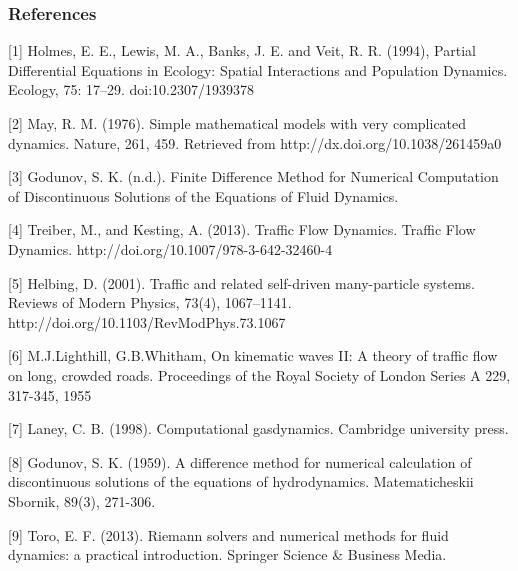 \documentclass[11pt]{article}
\begin{document}
\subsubsection{References}\label{references}

 {[}1{]} Holmes, E. E., Lewis, M. A., Banks, J. E. and Veit, R. R.
(1994), Partial Differential Equations in Ecology: Spatial Interactions
and Population Dynamics. Ecology, 75: 17--29. doi:10.2307/1939378

{[}2{]} May, R. M. (1976). Simple mathematical models with very
complicated dynamics. Nature, 261, 459. Retrieved from
http://dx.doi.org/10.1038/261459a0

{[}3{]} Godunov, S. K. (n.d.). Finite Difference Method for Numerical
Computation of Discontinuous Solutions of the Equations of Fluid
Dynamics.

{[}4{]} Treiber, M., and Kesting, A. (2013). Traffic Flow Dynamics.
Traffic Flow Dynamics. http://doi.org/10.1007/978-3-642-32460-4

{[}5{]} Helbing, D. (2001). Traffic and related self-driven
many-particle systems. Reviews of Modern Physics, 73(4), 1067--1141.
http://doi.org/10.1103/RevModPhys.73.1067

{[}6{]} M.J.Lighthill, G.B.Whitham, On kinematic waves II: A theory of
traffic flow on long, crowded roads. Proceedings of the Royal Society of
London Series A 229, 317-345, 1955

{[}7{]} Laney, C. B. (1998). Computational gasdynamics. Cambridge
university press.

{[}8{]} Godunov, S. K. (1959). A difference method for numerical
calculation of discontinuous solutions of the equations of
hydrodynamics. Matematicheskii Sbornik, 89(3), 271-306.

{[}9{]} Toro, E. F. (2013). Riemann solvers and numerical methods for
fluid dynamics: a practical introduction. Springer Science \& Business
Media.
\end{document}
